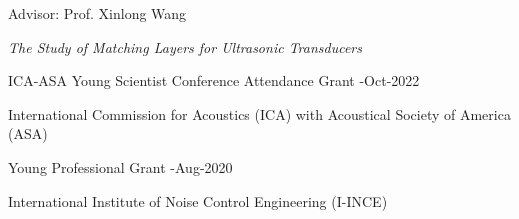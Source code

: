\documentclass[10pt,a4paper,ragged2e,withhyper]{altacv}
\begin{document}

\faUserTie Advisor: Prof. Xinlong Wang

\faBook \textit{The Study of Matching Layers for Ultrasonic Transducers}


\medskip















{\color{accent}ICA-ASA Young Scientist Conference Attendance Grant} 
\hfill {}-Oct-2022
\par
International Commission for
Acoustics (ICA) with Acoustical Society of America (ASA)

\divider

{\color{accent}Young Professional Grant}
\hfill {}-Aug-2020
\par
International Institute of Noise Control Engineering (I-INCE)

\divider
\end{document}
